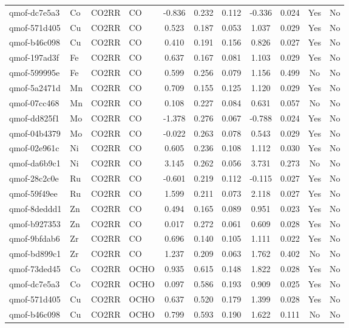 {\begin{longtable}{llllccccccc}
qmof-dc7e5a3 & Co & CO2RR & CO & -0.836 & 0.232 & 0.112 & -0.336 & 0.024 & Yes & No \\
qmof-571d405 & Cu & CO2RR & CO & 0.523 & 0.187 & 0.053 & 1.037 & 0.029 & Yes & No \\
qmof-b46c098 & Cu & CO2RR & CO & 0.410 & 0.191 & 0.156 & 0.826 & 0.027 & Yes & No \\
qmof-197ad3f & Fe & CO2RR & CO & 0.637 & 0.167 & 0.081 & 1.103 & 0.029 & Yes & No \\
qmof-599995e & Fe & CO2RR & CO & 0.599 & 0.256 & 0.079 & 1.156 & 0.499 & No & No \\
qmof-5a2471d & Mn & CO2RR & CO & 0.709 & 0.155 & 0.125 & 1.120 & 0.029 & Yes & No \\
qmof-07cc468 & Mn & CO2RR & CO & 0.108 & 0.227 & 0.084 & 0.631 & 0.057 & No & No \\
qmof-dd825f1 & Mo & CO2RR & CO & -1.378 & 0.276 & 0.067 & -0.788 & 0.024 & Yes & No \\
qmof-04b4379 & Mo & CO2RR & CO & -0.022 & 0.263 & 0.078 & 0.543 & 0.029 & Yes & No \\
qmof-02e961c & Ni & CO2RR & CO & 0.605 & 0.236 & 0.108 & 1.112 & 0.030 & Yes & No \\
qmof-da6b9c1 & Ni & CO2RR & CO & 3.145 & 0.262 & 0.056 & 3.731 & 0.273 & No & No \\
qmof-28c2c0e & Ru & CO2RR & CO & -0.601 & 0.219 & 0.112 & -0.115 & 0.027 & Yes & No \\
qmof-59f49ee & Ru & CO2RR & CO & 1.599 & 0.211 & 0.073 & 2.118 & 0.027 & Yes & No \\
qmof-8deddd1 & Zn & CO2RR & CO & 0.494 & 0.165 & 0.089 & 0.951 & 0.023 & Yes & No \\
qmof-b927353 & Zn & CO2RR & CO & 0.017 & 0.272 & 0.061 & 0.609 & 0.028 & Yes & No \\
qmof-9bfdab6 & Zr & CO2RR & CO & 0.696 & 0.140 & 0.105 & 1.111 & 0.022 & Yes & No \\
qmof-bd899c1 & Zr & CO2RR & CO & 1.237 & 0.209 & 0.063 & 1.762 & 0.402 & No & No \\
qmof-73ded45 & Co & CO2RR & OCHO & 0.935 & 0.615 & 0.148 & 1.822 & 0.028 & Yes & No \\
qmof-dc7e5a3 & Co & CO2RR & OCHO & 0.097 & 0.586 & 0.193 & 0.909 & 0.025 & Yes & No \\
qmof-571d405 & Cu & CO2RR & OCHO & 0.637 & 0.520 & 0.179 & 1.399 & 0.028 & Yes & No \\
qmof-b46c098 & Cu & CO2RR & OCHO & 0.799 & 0.593 & 0.190 & 1.622 & 0.111 & No & No \\

\end{longtable}}
